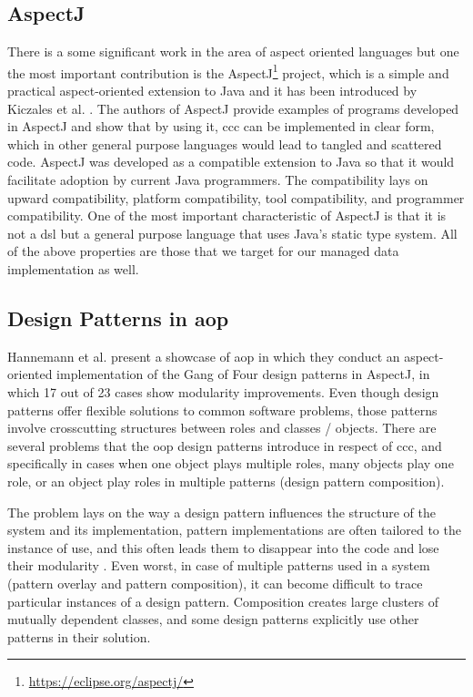 \subsection{AspectJ}\label{AspectJ}
There is a some significant work in the area of aspect oriented languages but one the most important contribution is the AspectJ\footnote{\url{https://eclipse.org/aspectj/}} project, which is a simple and practical aspect-oriented extension to Java and it has been introduced by Kiczales et al. \cite{kiczales2001overview}.
The authors of AspectJ provide examples of programs developed in AspectJ and show that by using it, \ac{ccc} can be implemented in clear form, which in other general purpose languages would lead to tangled and scattered code. 
AspectJ was developed as a compatible extension to Java so that it would facilitate adoption by current Java programmers. 
The compatibility lays on upward compatibility, platform compatibility, tool compatibility, and programmer compatibility. One of the most important characteristic of AspectJ is that it is not a \ac{dsl} but a general purpose language that uses Java's static type system.
All of the above properties are those that we target for our managed data implementation as well.

\subsection{Design Patterns in \acrlong{aop}}\label{Design Patterns in Aspect Oriented Programming}

Hannemann et al. present a showcase of \ac{aop} \cite{hannemann2002design} in which they conduct an aspect-oriented implementation of the Gang of Four design patterns \cite{gamma1995design} in AspectJ, in which 17 out of 23 cases show modularity improvements.
Even though design patterns offer flexible solutions to common software problems, those patterns involve crosscutting structures between roles and classes / objects. 
There are several problems that the \ac{oop} design patterns introduce in respect of \ac{ccc}, and specifically in cases when one object plays multiple roles, many objects play one role, or an object play roles in multiple patterns \cite{sullivan2002advanced} (design pattern composition).

The problem lays on the way a design pattern influences the structure of the system and its implementation, pattern implementations are often tailored to the instance of use, and this often leads them to disappear into the code and lose their modularity \cite{hannemann2002design}. Even worst, in case of multiple patterns used in a system (pattern overlay and pattern composition), it can become difficult to trace particular instances of a design pattern. 
Composition creates large clusters of mutually dependent classes\cite{sullivan2002advanced}, and some design patterns explicitly use other patterns in their solution.

